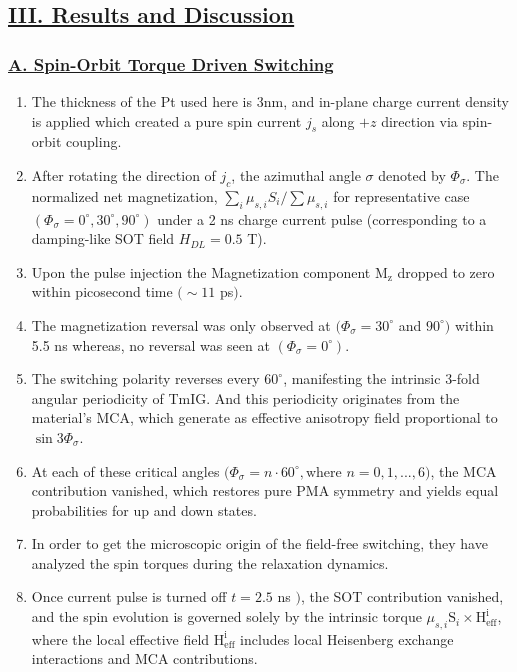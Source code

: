 \subsection*{\centering\underline{III. Results and Discussion}}
\subsubsection*{\underline{A. Spin-Orbit Torque Driven Switching}}
\begin{enumerate}
    \item The thickness of the Pt used here is 3nm, and in-plane charge current density is applied which created a pure spin current $j_s$ along $+z$ direction via spin-orbit coupling.
    \item After rotating the direction of $j_c$, the azimuthal angle $\sigma$ denoted by $\Phi_{\sigma}$. The normalized net magnetization, $\sum_i\mu_{s,i}S_i/\sum\mu_{s,i}$ for representative case $(\Phi_{\sigma}=0^\circ, 30^\circ, 90^\circ)$ under a 2 ns charge current pulse (corresponding to a damping-like SOT field $H_{DL}=0.5$ T).
    \item Upon the pulse injection the Magnetization component $\mathrm{M_z}$ dropped to zero within picosecond time $(\sim 11$ ps$)$.
    \item The magnetization reversal was only observed at $(\Phi_{\sigma}= 30^\circ$ and $90^\circ)$ within 5.5 ns whereas, no reversal was seen at $(\Phi_{\sigma}=0^\circ)$.
    \item The switching polarity reverses every $60^\circ$, manifesting the intrinsic 3-fold angular periodicity of TmIG. And this periodicity originates from the material's MCA, which generate as effective anisotropy field proportional to $\sin3\Phi_{\sigma}$.
    \item At each of these critical angles $(\Phi_{\sigma}=n\cdot60^\circ, \mathrm{where}$ $n = 0, 1, ...,6)$, the MCA contribution vanished, which restores pure PMA symmetry and yields equal probabilities for up and down states.
    \item In order to get the microscopic origin of the field-free switching, they have analyzed the spin torques during the relaxation dynamics.
    \item Once current pulse is turned off $t=2.5$ ns $)$, the SOT contribution vanished, and the spin evolution is governed solely by the intrinsic torque $\mu_{s,i}\mathrm{S}_i\times\mathrm{H_{eff}^i}$, where the local effective field $\mathrm{H_{eff}^i}$ includes local Heisenberg exchange interactions and MCA contributions.

\end{enumerate}
